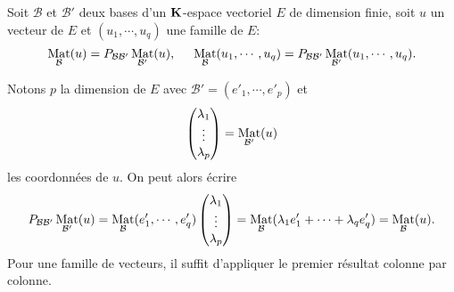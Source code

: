 \begin{propn}
 Soit $\mathcal B$ et $\mathcal B'$ deux bases d'un $\mathbf{K}$-espace vectoriel $E$ de dimension finie, soit $u$ un vecteur de $E$ et $(u_1,\cdots,u_q)$ une famille de $E$:
\[
 \mathop{\mathrm{Mat}}_{\mathcal B}(u) = P_{\mathcal B \mathcal B'}\mathop{\mathrm{Mat}}_{\mathcal B'}(u), \hspace{0.5cm}
\mathop{\mathrm{Mat}}_{\mathcal B}(u_1,\cdots,u_q) = P_{\mathcal B \mathcal B'}\mathop{\mathrm{Mat}}_{\mathcal B'}(u_1,\cdots,u_q).
\]
\end{propn}
\begin{demo}
 Notons $p$ la dimension de $E$ avec $\mathcal{B}'=(e'_1,\cdots,e'_p)$ et 
\begin{displaymath}
 \begin{pmatrix} \lambda_1 \\ \vdots \\ \lambda_p \end{pmatrix}= \mathop{\mathrm{Mat}}_{\mathcal B '}(u)
\end{displaymath}
les coordonnées de $u$. On peut alors écrire
\begin{displaymath}
 P_{\mathcal B \mathcal B'}\mathop{\mathrm{Mat}}_{\mathcal B'}(u)
= \mathop{\mathrm{Mat}}_{\mathcal B}(e'_1,\cdots,e'_q)\begin{pmatrix} \lambda_1 \\ \vdots \\ \lambda_p \end{pmatrix}
= \mathop{\mathrm{Mat}}_{\mathcal B}(\lambda_1 e'_1 + \cdots + \lambda_q e'_q)
= \mathop{\mathrm{Mat}}_{\mathcal B}(u).
\end{displaymath}
Pour une famille de vecteurs, il suffit d'appliquer le premier résultat colonne par colonne.
\end{demo}

